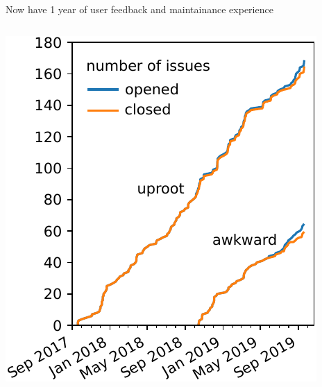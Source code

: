 \documentclass[aspectratio=169]{beamer}
\begin{document}
\begin{frame}{Now have 1 year of user feedback and maintainance experience}
\begin{columns}
\vspace{0.2 cm}
\hspace{-0.25 cm}\includegraphics[width=\linewidth]{uproot-issues.pdf}
\end{columns}
\end{frame}
\end{document}

